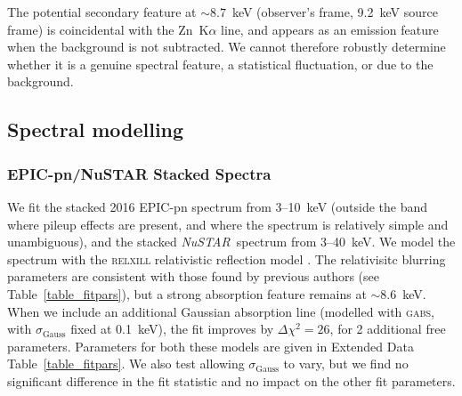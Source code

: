 \documentclass[10pt, a4paper]{article}
\newcommand{\nustar}{\textit{NuSTAR}}
\begin{document}
The potential secondary feature at $\sim8.7$~keV (observer's frame, 9.2~keV source frame) is coincidental with the Zn~K$\alpha$ line, and appears as an emission feature when the background is not subtracted. We cannot therefore robustly determine whether it is a genuine spectral feature, a statistical fluctuation, or due to the background.

\subsection*{Spectral modelling}

\subsubsection*{EPIC-pn/NuSTAR Stacked Spectra}

We fit the stacked 2016 EPIC-pn spectrum from 3--10~keV (outside the band where pileup effects are present, and where the spectrum is relatively simple and unambiguous), and the stacked \nustar\ spectrum from 3--40~keV. We model the spectrum with the \textsc{relxill} relativistic reflection model \cite{Garcia14}. The relativisitc blurring parameters are consistent with those found by previous authors\cite{Fabian13} (see Table~\ref{table_fitpars}), but a strong absorption feature remains at $\sim8.6$~keV. When we include an additional Gaussian absorption line (modelled with \textsc{gabs}, with $\sigma_\mathrm{Gauss}$ fixed at 0.1~keV), the fit improves by $\Delta\chi^2=26$, for 2 additional free parameters. Parameters for both these models are given in Extended Data Table~\ref{table_fitpars}. We also test allowing $\sigma_\mathrm{Gauss}$ to vary, but we find no significant difference in the fit statistic and no impact on the other fit parameters.
\end{document}

